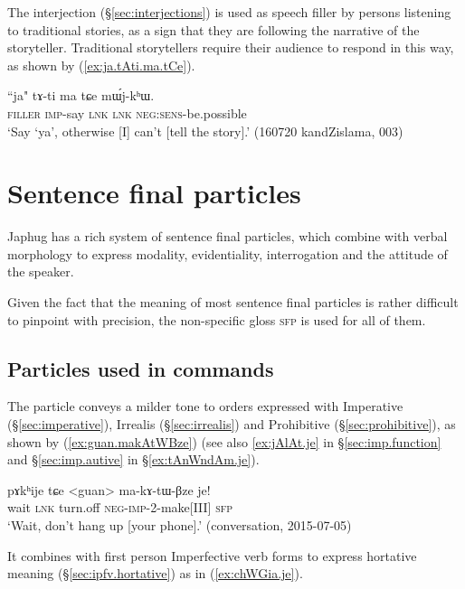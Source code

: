 The interjection  (§\ref{sec:interjections}) is used as speech filler by persons listening to traditional stories, as a sign that they are following the narrative of the storyteller. Traditional storytellers require their audience to respond in this way, as shown by (\ref{ex:ja.tAti.ma.tCe}).

\begin{exe}
\ex \label{ex:ja.tAti.ma.tCe}
\gll ``ja" tɤ-ti ma tɕe mɯ́j-kʰɯ. \\
\textsc{filler} \textsc{imp}-say \textsc{lnk} \textsc{lnk} \textsc{neg}:\textsc{sens}-be.possible \\
\glt `Say `ya', otherwise [I] can't [tell the story].' (160720 kandZislama, 003)
\end{exe}

\section{Sentence final particles} \label{sec:sfp}
Japhug has a rich system of sentence final particles, which combine with verbal morphology to express modality, evidentiality, interrogation and the attitude of the speaker.

Given the fact that the meaning of most sentence final particles is rather difficult to pinpoint with precision, the non-specific gloss \textsc{sfp} is used for all of them.
 
\subsection{Particles used in commands} \label{sec:fsp.imp}
The particle  conveys a milder tone to orders expressed with Imperative (§\ref{sec:imperative}), Irrealis (§\ref{sec:irrealis}) and Prohibitive (§\ref{sec:prohibitive}), as shown by (\ref{ex:guan.makAtWBze}) (see also \ref{ex:jAlAt.je} in §\ref{sec:imp.function} and §\ref{sec:imp.autive} in §\ref{ex:tAnWndAm.je}).


\begin{exe}
\ex \label{ex:guan.makAtWBze}
\gll pɤkʰije tɕe <guan> ma-kɤ-tɯ-βze je! \\
wait \textsc{lnk} turn.off \textsc{neg}-\textsc{imp}-2-make[III] \textsc{sfp} \\
\glt `Wait, don't hang up [your phone].' (conversation, 2015-07-05)
\end{exe}

It combines with first person Imperfective verb forms to express hortative meaning (§\ref{sec:ipfv.hortative}) as in (\ref{ex:chWGia.je}). 

